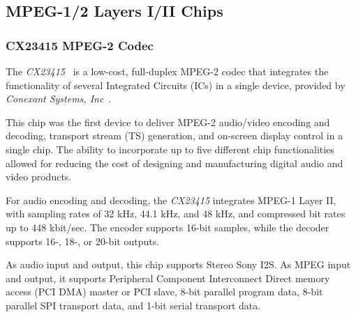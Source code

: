 \vspace{5mm}

\subsection{MPEG-1/2 Layers I/II Chips}

\subsubsection{CX23415 MPEG-2 Codec}

The \textit{CX23415}~\cite{cx23415} is a low-cost, full-duplex MPEG-2 codec that integrates the functionality of several Integrated Circuits (ICs) in a single device, provided by \textit{Conexant Systems, Inc}~\cite{conexant}.

This chip was the first device to deliver MPEG-2 audio/video encoding and decoding, transport stream (TS) generation, and on-screen display control in a single chip. The ability to incorporate up to five different chip functionalities allowed for reducing the cost of designing and manufacturing digital audio and video products.



For audio encoding and decoding, the \textit{CX23415} integrates MPEG-1 Layer II, with sampling rates of 32 kHz, 44.1 kHz, and 48 kHz, and compressed bit rates up to 448 kbit/sec. The encoder supports 16-bit samples, while the decoder supports 16-, 18-, or 20-bit outputs.

As audio input and output, this chip supports Stereo Sony I2S. As MPEG input and output, it supports Peripheral Component Interconnect Direct memory access (PCI DMA) master or PCI slave, 8-bit parallel program data, 8-bit parallel SPI transport data, and 1-bit serial transport data.

